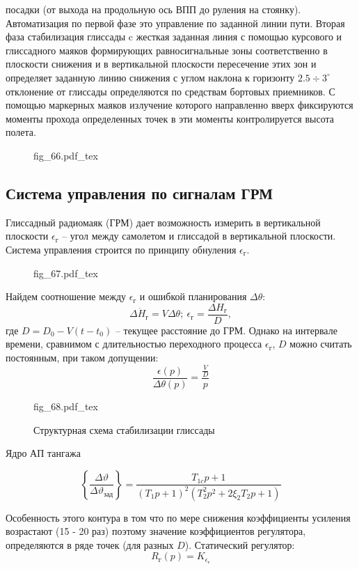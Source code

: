 \documentclass{article}
\newcommand{\incfig}[1]{
    {#1.pdf_tex}
}
\begin{document}
посадки (от выхода на продольную ось ВПП до руления на стоянку).
Автоматизация по первой фазе это управление по заданной линии пути. Вторая фаза
стабилизация глиссады c жесткая заданная линия с помощью курсового и
глиссадного маяков формирующих равносигнальные зоны соответственно в плоскости
снижения и в вертикальной плоскости пересечение этих зон и определяет заданную
линию снижения с углом наклона к горизонту $2.5 \div 3^\circ$ отклонение от
глиссады определяются по средствам бортовых приемников.
С помощью маркерных маяков излучение которого направленно вверх фиксируются
моменты прохода определенных точек в эти моменты контролируется высота полета.
\begin{figure}[H]
	\centering
	\incfig{fig_66}
	\label{fig:fig_66}
\end{figure}

\subsection{Система управления по сигналам ГРМ}
Глиссадный радиомаяк (ГРМ) дает возможность измерить в вертикальной плоскости
$\epsilon_\text{г}$  -- угол между самолетом и глиссадой в вертикальной
плоскости. Система управления строится по принципу обнуления
$\epsilon_\text{г}$.
\begin{figure}[H]
	\centering
	\incfig{fig_67}
	\label{fig:fig_67}
\end{figure}

Найдем соотношение между $\epsilon_\text{г}$ и ошибкой планирования $\Delta
	\theta$:
\[
	\Delta \dot{H}_{\text{г}} = V \Delta \theta; \ \epsilon_\text{г} =
	\frac{\Delta H_\text{г}}{D},
\]
где $D = D_0 - V(t-t_0)$ -- текущее расстояние до ГРМ.
Однако на интервале времени, сравнимом с длительностью переходного процесса
$\epsilon_\text{г}$, $D$ можно считать постоянным, при таком допущении:
\[
	\frac{\epsilon(p)}{\Delta \theta(p)} = \frac{\frac{V}{D}}{p}
\]

\begin{figure}[H]
	\centering
	\incfig{fig_68}
	\caption{Структурная схема стабилизации глиссады}
	\label{fig:fig_68}
\end{figure}
Ядро АП тангажа

\[
	\left\{ \frac{\Delta \vartheta}{\Delta \vartheta_\text{зад}} \right\}  =
	\frac{T_{1c}p + 1}{(T_{1}p + 1)^2 ( T_2^2p^2 + 2 \xi_2 T_2 p + 1 )}
\]


Особенность этого контура в том что по мере снижения коэффициенты усиления
возрастают (15 - 20 раз) поэтому значение коэффициентов регулятора,
определяются в ряде точек (для разных $D$).
Статический регулятор:
\[
	R_\text{г}(p) = K_{\epsilon_\text{г}}
\]
\end{document}
